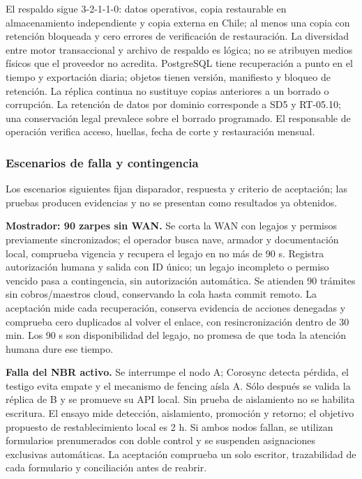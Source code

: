 \documentclass[11pt,letterpaper]{report}
\begin{document}
El respaldo sigue 3-2-1-1-0: datos operativos, copia restaurable en almacenamiento independiente y copia externa en Chile; al menos una copia con retención bloqueada y cero errores de verificación de restauración. La diversidad entre motor transaccional y archivo de respaldo es lógica; no se atribuyen medios físicos que el proveedor no acredita. PostgreSQL tiene recuperación a punto en el tiempo y exportación diaria; objetos tienen versión, manifiesto y bloqueo de retención. La réplica continua no sustituye copias anteriores a un borrado o corrupción. La retención de datos por dominio corresponde a SD5 y RT-05.10; una conservación legal prevalece sobre el borrado programado. El responsable de operación verifica acceso, huellas, fecha de corte y restauración mensual.

\subsubsection*{Escenarios de falla y contingencia}

Los escenarios siguientes fijan disparador, respuesta y criterio de aceptación; las pruebas producen evidencias y no se presentan como resultados ya obtenidos.

\textbf{Mostrador: 90 zarpes sin WAN.} Se corta la WAN con legajos y permisos previamente sincronizados; el operador busca nave, armador y documentación local, comprueba vigencia y recupera el legajo en no más de 90 s. Registra autorización humana y salida con ID único; un legajo incompleto o permiso vencido pasa a contingencia, sin autorización automática. Se atienden 90 trámites sin cobros/maestros cloud, conservando la cola hasta commit remoto. La aceptación mide cada recuperación, conserva evidencia de acciones denegadas y comprueba cero duplicados al volver el enlace, con resincronización dentro de 30 min. Los 90 s son disponibilidad del legajo, no promesa de que toda la atención humana dure ese tiempo.

\textbf{Falla del NBR activo.} Se interrumpe el nodo A; Corosync detecta pérdida, el testigo evita empate y el mecanismo de fencing aísla A. Sólo después se valida la réplica de B y se promueve su API local. Sin prueba de aislamiento no se habilita escritura. El ensayo mide detección, aislamiento, promoción y retorno; el objetivo propuesto de restablecimiento local es 2 h. Si ambos nodos fallan, se utilizan formularios prenumerados con doble control y se suspenden asignaciones exclusivas automáticas. La aceptación comprueba un solo escritor, trazabilidad de cada formulario y conciliación antes de reabrir.
\end{document}
